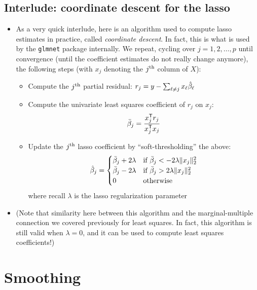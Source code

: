 \documentclass{article}
\begin{document}
\subsection{Interlude: coordinate descent for the lasso}

\begin{itemize}
\item As a very quick interlude, here is an algorithm used to compute lasso
  estimates in practice, called \emph{coordinate descent}. In fact, this is what
  is used by the \verb|glmnet| package internally. We repeat, cycling over 
  $j=1,2,\dots,p$ until convergence (until the coefficient estimates do not
  really change anymore), the following steps (with $x_j$ denoting the $j^{\textnormal{th}}$
  column of $X$): 

\begin{itemize}
\item Compute the $j^{\textnormal{th}}$ partial residual: $r_j = y - \sum_{\ell \not= j} x_\ell 
  \hat{\beta}_\ell$  

\item Compute the univariate least squares coefficient of $r_j$ on $x_j$: 
  \[
  \bar\beta_j = \frac{x_j^{\mathsf{T}} r_j}{x_j^{\mathsf{T}} x_j}
  \]

\item Update the $j^{\textnormal{th}}$ lasso coefficient by ``soft-thresholding'' the above: 
  \[
  \hat{\beta}_j = \begin{cases}
  \bar\beta_j + 2\lambda & \text{if $\bar\beta_j < -2\lambda \|x_j\|_2^2$} \\  
  \bar\beta_j - 2\lambda & \text{if $\bar\beta_j > 2\lambda \|x_j\|_2^2$} \\ 
  0 & \text{otherwise}
  \end{cases}
  \]
  where recall $\lambda$ is the lasso regularization parameter 
\end{itemize}

\item (Note that similarity here between this algorithm and the
  marginal-multiple connection we covered previously for least squares. In 
  fact, this algorithm is still valid when $\lambda = 0$, and it can be used to 
  compute least squares coefficients!) 
\end{itemize}

\section{Smoothing}
\end{document}
